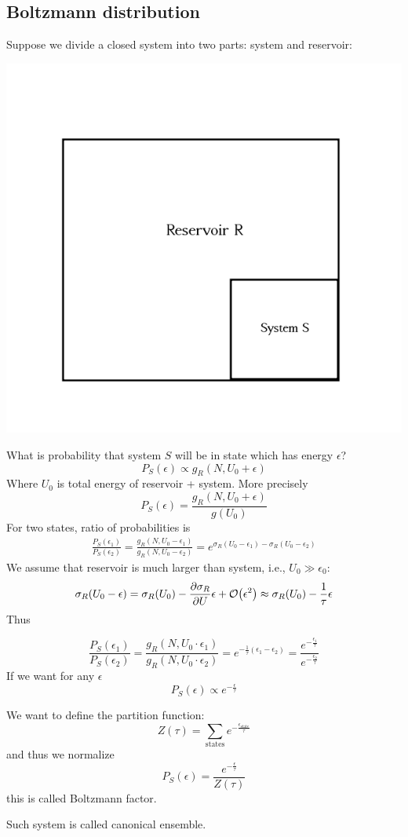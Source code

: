 \subsection{Boltzmann distribution}
Suppose we divide a closed system into two parts: system and reservoir: 
\begin{center}
	\includegraphics[width=0.5\linewidth]{./lect5/pic1.png}
\end{center}
What is probability that system $S$ will be in state which has energy $\epsilon$?
$$P_S(\epsilon)  \propto g_R(N,U_0 + \epsilon)$$
Where $U_0$ is total energy of reservoir + system. 
More precisely
$$P_S(\epsilon) = \frac{g_R(N,U_0 + \epsilon)}{g(U_0)}$$
For two states, ratio of probabilities is
\begin{align*}
\frac{P_S(\epsilon_1)}{P_S(\epsilon_2)} = \frac{g_R(N,U_0 - \epsilon_1)}{g_R(N,U_0 - \epsilon_2)} = e^{\sigma_R(U_0-\epsilon_1)-\sigma_R(U_0-\epsilon_2)}
\end{align*}
We assume that reservoir is much larger than system, i.e., $U_0 \gg \epsilon_0$:
$$\sigma_R(U_0 -\epsilon) = \sigma_R(U_0) - \pdv{\sigma_R}{U}\epsilon + \order{\epsilon^2} \approx  \sigma_R(U_0) - \frac{1}{\tau} \epsilon$$
Thus

$$\frac{P_S(\epsilon_1)}{P_S(\epsilon_2)} = \frac{g_R(N,U_0 \cdot \epsilon_1)}{g_R(N,U_0 \cdot \epsilon_2)} = e^{-\frac{1}{\tau} (\epsilon_1-\epsilon_2)} = \frac{ e^{-\frac{\epsilon_1}{\tau}}}{ e^{-\frac{\epsilon_2}{\tau}}}$$ 
If we want for any $\epsilon$
$$P_S(\epsilon) \propto e^{-\frac{\epsilon}{\tau}}$$

We want to define the partition function:
$$Z(\tau) = \sum_{\text{states}} e^{-\frac{\epsilon_{\text{state}}}{\tau}}$$
and thus we normalize
$$P_S(\epsilon) = \frac{e^{-\frac{\epsilon}{\tau}}}{Z(\tau)}$$
this is called Boltzmann factor.

Such system is called canonical ensemble.